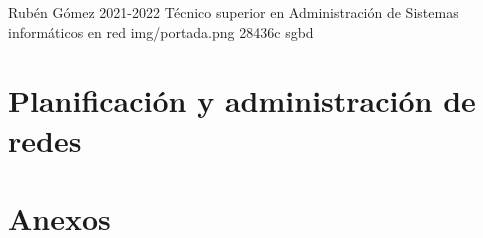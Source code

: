 \documentclass{../../../yukibook.cls/yukibook}
\begin{document}
    {Rubén Gómez}  %
    {2021-2022}    %
    {Técnico superior en Administración de \linebreak Sistemas informáticos en red} %
    {}	%
    {}	%
    {img/portada.png} %
    {28436c}
    {sgbd} %

    \part{Planificación y administración de redes}
    \graphicspath{{img/redes/}}
    

    \part{Anexos}

    

    \graphicspath{{../../../anexos/instalar_ubuntu_lts/}}
    

    \graphicspath{{../../../anexos/virtualbox_networking/}}
    
    \graphicspath{{../../../anexos/}}
    
\end{document}
